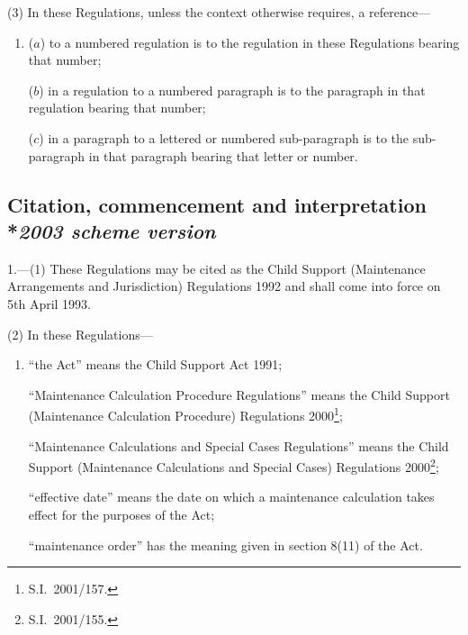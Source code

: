 \documentclass[12pt,a4paper]{article}
\begin{document}
(3) In these Regulations, unless the context otherwise requires, a reference—
\begin{enumerate}\item[]
($a$) to a numbered regulation is to the regulation in these Regulations bearing that number;

($b$) in a regulation to a numbered paragraph is to the paragraph in that regulation bearing that number;

($c$) in a paragraph to a lettered or numbered sub-paragraph is to the sub-paragraph in that paragraph bearing that letter or number.
\end{enumerate}


\subsection[1. Citation, commencement and interpretation --- \emph{2003 scheme version}]{Citation, commencement and interpretation\\*\emph{2003 scheme version}}

1.—(1) These Regulations may be cited as the Child Support (Maintenance Arrangements and Jurisdiction) Regulations 1992 and shall come into force on 5th April 1993.

(2) In these Regulations—
\begin{enumerate}\item[]
“the Act” means the Child Support Act 1991;

“Maintenance Calculation Procedure Regulations” means the Child Support (Maintenance Calculation Procedure) Regulations 2000\footnote{S.I.\ 2001/157.}; %

“Maintenance Calculations and Special Cases Regulations” means the Child Support (Maintenance Calculations and Special Cases) Regulations 2000\footnote{S.I.\ 2001/155.}; %

“effective date” means the date on which a maintenance 
calculation
takes effect for the purposes of the Act;

“maintenance order” has the meaning given in section 8(11) of the Act.
\end{enumerate}
\end{document}
